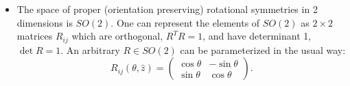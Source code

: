 \documentclass[12pt, oneside]{article}   	%
\theoremstyle{definition}
\begin{document}
\begin{itemize}

	
	
	\item The space of proper (orientation preserving) rotational symmetries in 2 dimensions is $SO(2)$. One can represent the elements of $SO(2)$ as $2\times 2$ matrices $R_{ij}$ which are orthogonal, $R^T R = 1$, and have determinant 1, $\det R = 1$. An arbitrary $R\in SO(2)$ can be parameterized in the usual way:
	\begin{equation}
		R_{ij}(\theta, \hat z) = \begin{pmatrix} \cos\theta & -\sin\theta \\ \sin\theta & \cos\theta \end{pmatrix}.
	\end{equation}
	

\end{itemize}
\end{document}
